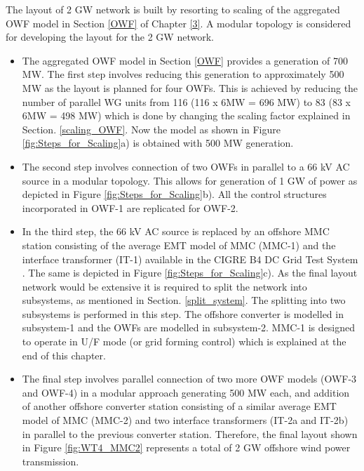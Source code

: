 The layout of 2 GW network is built by resorting to scaling of the aggregated \gls{OWF} model in Section \ref{OWF} of Chapter \ref{3}. A modular topology is considered for developing the layout for the 2 GW network. 

\begin{itemize}
    \item The aggregated \gls{OWF} model in Section \ref{OWF} provides a generation of 700 MW. The first step involves reducing this generation to approximately 500 MW as the layout is planned for four \gls{OWF}s. This is achieved by reducing the number of parallel \gls{WG} units from 116 (116 x 6MW = 696 MW) to 83 (83 x 6MW = 498 MW) which is done by changing the scaling factor explained in Section. \ref{scaling_OWF}. Now the model as shown in Figure \ref{fig:Steps_for_Scaling}a) is obtained with 500 MW generation.
    \item The second step involves connection of two \gls{OWF}s in parallel to a 66 kV \gls{AC} source in a modular topology. This allows for generation of 1 GW of power as depicted in Figure \ref{fig:Steps_for_Scaling}b). All the control structures incorporated in \gls{OWF}-1 are replicated for \gls{OWF}-2.
    \item In the third step, the 66 kV \gls{AC} source is replaced by an offshore \gls{MMC} station consisting of the average \gls{EMT} model of \gls{MMC} (\gls{MMC}-1) and the interface transformer (IT-1) available in the CIGRE B4 DC Grid Test System \cite{vrana2013cigre}. The same is depicted in Figure \ref{fig:Steps_for_Scaling}c). As the final layout network would be extensive it is required to split the network into subsystems, as mentioned in Section. \ref{split_system}. The splitting into two subsystems is performed in this step. The offshore converter is modelled in subsystem-1 and the \gls{OWF}s are modelled in subsystem-2. \gls{MMC}-1 is designed to operate in U/F mode (or grid forming control) which is explained at the end of this chapter.
    \item The final step involves parallel connection of two more \gls{OWF} models (\gls{OWF}-3 and \gls{OWF}-4) in a modular approach generating 500 MW each, and addition of another offshore converter station consisting of a similar average \gls{EMT} model of \gls{MMC} (\gls{MMC}-2) and two interface transformers (IT-2a and IT-2b) in parallel to the previous converter station. Therefore, the final layout shown in Figure \ref{fig:WT4_MMC2} represents a total of 2 GW offshore wind power transmission.
\end{itemize}


